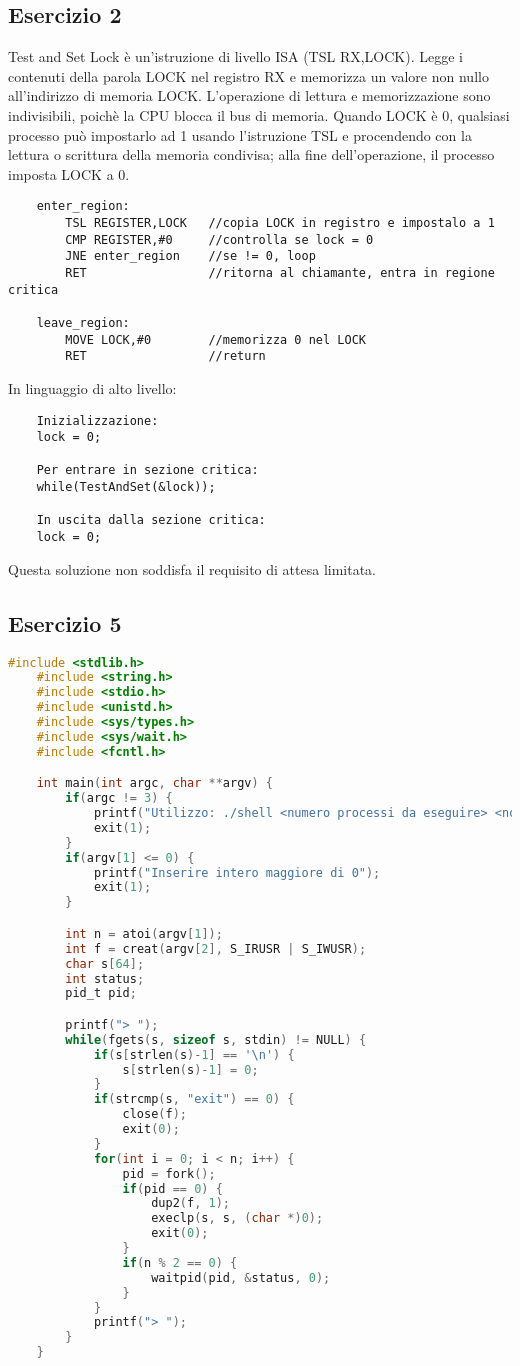\documentclass[12pt]{article}
\begin{document}
\subsection*{Esercizio 2}
Test and Set Lock è un'istruzione di livello ISA (TSL RX,LOCK). Legge i contenuti della parola LOCK nel registro RX e 
memorizza un valore non nullo all'indirizzo di memoria LOCK. L'operazione di lettura e memorizzazione sono indivisibili, 
poichè la CPU blocca il bus di memoria. Quando LOCK è 0, qualsiasi processo può impostarlo ad 1 usando l'istruzione TSL 
e procendendo con la lettura o scrittura della memoria condivisa; alla fine dell'operazione, il processo imposta LOCK a 
0. 
\begin{lstlisting}
    enter_region:
        TSL REGISTER,LOCK   //copia LOCK in registro e impostalo a 1
        CMP REGISTER,#0     //controlla se lock = 0
        JNE enter_region    //se != 0, loop
        RET                 //ritorna al chiamante, entra in regione critica

    leave_region:
        MOVE LOCK,#0        //memorizza 0 nel LOCK
        RET                 //return
\end{lstlisting}
In linguaggio di alto livello:
\begin{lstlisting}
    Inizializzazione:
    lock = 0;

    Per entrare in sezione critica:
    while(TestAndSet(&lock));

    In uscita dalla sezione critica:
    lock = 0;
\end{lstlisting}
Questa soluzione non soddisfa il requisito di attesa limitata.
\subsection*{Esercizio 5}
\begin{lstlisting}[language=c]
    #include <stdlib.h>
    #include <string.h>
    #include <stdio.h>
    #include <unistd.h>
    #include <sys/types.h>
    #include <sys/wait.h>
    #include <fcntl.h>

    int main(int argc, char **argv) {
        if(argc != 3) {
            printf("Utilizzo: ./shell <numero processi da eseguire> <nome file>");
            exit(1);
        }
        if(argv[1] <= 0) {
            printf("Inserire intero maggiore di 0");
            exit(1);
        }

        int n = atoi(argv[1]);
        int f = creat(argv[2], S_IRUSR | S_IWUSR);
        char s[64];
        int status;
        pid_t pid;

        printf("> ");   
        while(fgets(s, sizeof s, stdin) != NULL) {
            if(s[strlen(s)-1] == '\n') {
                s[strlen(s)-1] = 0;
            }
            if(strcmp(s, "exit") == 0) {
                close(f);
                exit(0);
            }
            for(int i = 0; i < n; i++) {
                pid = fork();
                if(pid == 0) {
                    dup2(f, 1);
                    execlp(s, s, (char *)0);
                    exit(0);
                }
                if(n % 2 == 0) {
                    waitpid(pid, &status, 0);
                }
            }
            printf("> ");
        }
    }
\end{lstlisting}
\end{document}
